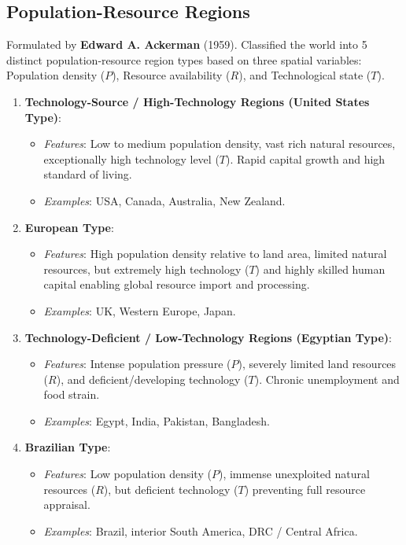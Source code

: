 \documentclass[11pt,a4paper]{article}
\begin{document}
\subsection{Population-Resource Regions}

\begin{modelbox}
Formulated by \textbf{Edward A. Ackerman} (1959). Classified the world into 5 distinct population-resource region types based on three spatial variables: Population density ($P$), Resource availability ($R$), and Technological state ($T$).
\end{modelbox}

\begin{enumerate}[leftmargin=*]
  \item \textbf{Technology-Source / High-Technology Regions (United States Type)}:
  \begin{itemize}
    \item \textit{Features}: Low to medium population density, vast rich natural resources, exceptionally high technology level ($T$). Rapid capital growth and high standard of living.
    \item \textit{Examples}: USA, Canada, Australia, New Zealand.
  \end{itemize}

  \item \textbf{European Type}:
  \begin{itemize}
    \item \textit{Features}: High population density relative to land area, limited natural resources, but extremely high technology ($T$) and highly skilled human capital enabling global resource import and processing.
    \item \textit{Examples}: UK, Western Europe, Japan.
  \end{itemize}

  \item \textbf{Technology-Deficient / Low-Technology Regions (Egyptian Type)}:
  \begin{itemize}
    \item \textit{Features}: Intense population pressure ($P$), severely limited land resources ($R$), and deficient/developing technology ($T$). Chronic unemployment and food strain.
    \item \textit{Examples}: Egypt, India, Pakistan, Bangladesh.
  \end{itemize}

  \item \textbf{Brazilian Type}:
  \begin{itemize}
    \item \textit{Features}: Low population density ($P$), immense unexploited natural resources ($R$), but deficient technology ($T$) preventing full resource appraisal.
    \item \textit{Examples}: Brazil, interior South America, DRC / Central Africa.
  \end{itemize}


\end{enumerate}
\end{document}
